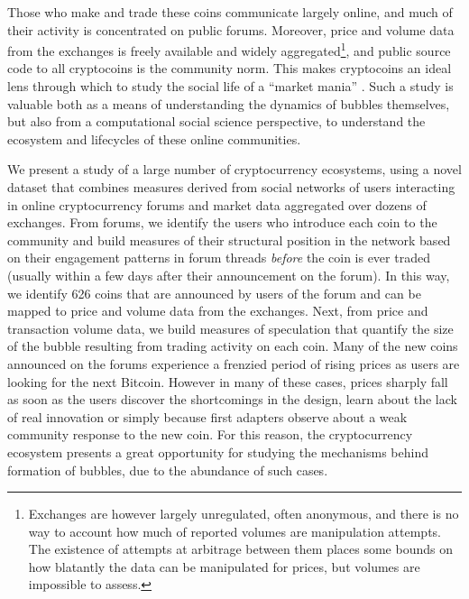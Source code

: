 Those who make and trade these coins communicate largely online, and much of their activity is concentrated on public forums. 
Moreover, price and volume data from the exchanges is freely available and widely aggregated\footnote{Exchanges are however largely unregulated, often anonymous, and there is no way to account how much of reported volumes are manipulation attempts. The existence of attempts at arbitrage between them places some bounds on how blatantly the data can be manipulated for prices, but volumes are impossible to assess. },
and public source code to all cryptocoins is the community norm. This makes cryptocoins
an ideal lens through which to study the social life of a ``market mania'' \cite{cosma2008}.
Such a study is valuable both as a means of understanding the dynamics of bubbles themselves, but also from a computational social science perspective, to understand the ecosystem and lifecycles of these online communities.

We present a study of a large number of cryptocurrency ecosystems, 
using a novel dataset that combines measures derived from social networks of users interacting in online cryptocurrency forums and market data aggregated over dozens of exchanges.
From forums, we identify the users who introduce each coin to the community and build measures of their structural position in the network based on
their engagement patterns in forum threads \emph{before} the coin is ever traded (usually within a few days after their announcement on the forum).
In this way, we identify 626 coins that are announced by users of the forum and can be mapped to price and volume data from the exchanges.
Next, from price and transaction volume data, we build measures of speculation that quantify the size of the bubble resulting from trading activity on each coin. 
Many of the new coins announced on the forums experience a frenzied period of rising prices as users are looking for the next Bitcoin. However in many of these cases, prices sharply fall as soon as the users discover the shortcomings in the design, learn about the lack of real innovation or simply because first adapters observe about a weak community response to the new coin. For this reason, the cryptocurrency ecosystem presents a great opportunity for studying the mechanisms behind formation of bubbles, due to the abundance of such cases.


